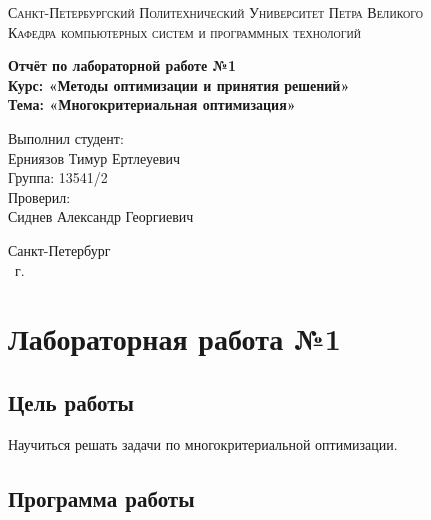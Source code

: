\documentclass[14pt,a4paper,report]{report}
\begin{document}
\def\contentsname{Содержание}

\begin{titlepage}
 \begin{center}
  \textsc{Санкт-Петербургский Политехнический 
   Университет Петра Великого\\[5mm]
   Кафедра компьютерных систем и программных технологий}
  
  \vfill
  
  \textbf{Отчёт по лабораторной работе №1\\[3mm]
   Курс: «Методы оптимизации и принятия решений»\\[3mm]
   Тема: «Многокритериальная оптимизация»\\[35mm]
   }
 \end{center}
 
 \hfill
 \begin{minipage}{.5\textwidth}
  Выполнил студент:\\[2mm] 
Ерниязов Тимур Ертлеуевич\\
  Группа: 13541/2\\[5mm]
  
  Проверил:\\[2mm] 
  Сиднев Александр Георгиевич
 \end{minipage}
 \vfill
 \begin{center}
  Санкт-Петербург\\ \the\year\ г.
 \end{center}
\end{titlepage}

\tableofcontents
\clearpage

\chapter{Лабораторная работа №1}

\section{Цель работы}

Научиться решать задачи по многокритериальной оптимизации.

\section{Программа работы}
\end{document}
